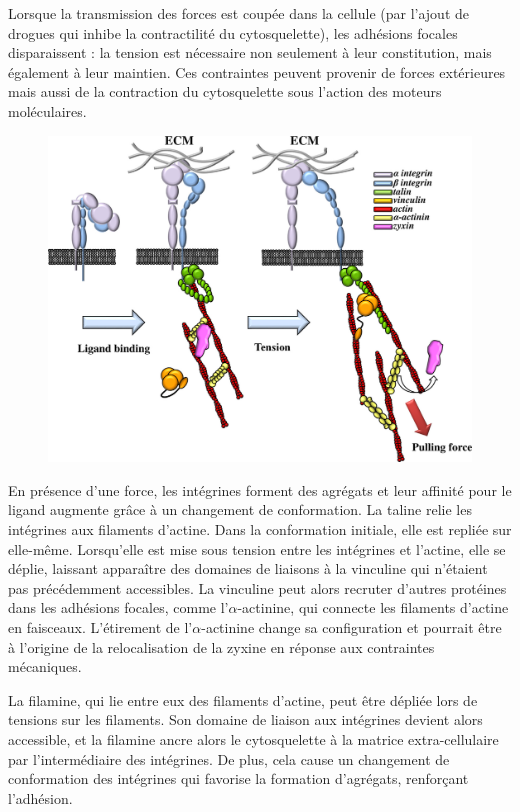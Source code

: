 Lorsque la transmission des forces est coupée dans la cellule (par l'ajout de drogues qui inhibe la contractilité du cytosquelette), les adhésions focales disparaissent : la tension est nécessaire non seulement à leur constitution, mais également à leur maintien. Ces contraintes peuvent provenir de forces extérieures mais aussi de la contraction du cytosquelette sous l'action des moteurs moléculaires. 

\begin{figure}
\includegraphics[scale=0.2]{Focal_adhesions_taline.png}
\end{figure}

En présence d'une force, les intégrines forment des agrégats et leur affinité pour le ligand augmente grâce à un changement de conformation. 
La taline relie les intégrines aux filaments d'actine. Dans la conformation initiale, elle est repliée sur elle-même. Lorsqu'elle est mise sous tension entre les intégrines et l'actine, elle se déplie, laissant apparaître des domaines de liaisons à la vinculine qui n'étaient pas précédemment accessibles. 
La vinculine peut alors recruter d'autres protéines dans les adhésions focales, comme l'$\alpha$-actinine, qui connecte les filaments d'actine en faisceaux. L'étirement de l'$\alpha$-actinine change sa configuration et pourrait être à l'origine de la relocalisation de la zyxine en réponse aux contraintes mécaniques. 

La filamine, qui lie entre eux des filaments d'actine, peut être dépliée lors de tensions sur les filaments. Son domaine de liaison aux intégrines devient alors accessible, et la filamine ancre alors le cytosquelette à la matrice extra-cellulaire par l'intermédiaire des intégrines. De plus, cela cause un changement de conformation des intégrines qui favorise la formation d'agrégats, renforçant l'adhésion. 

